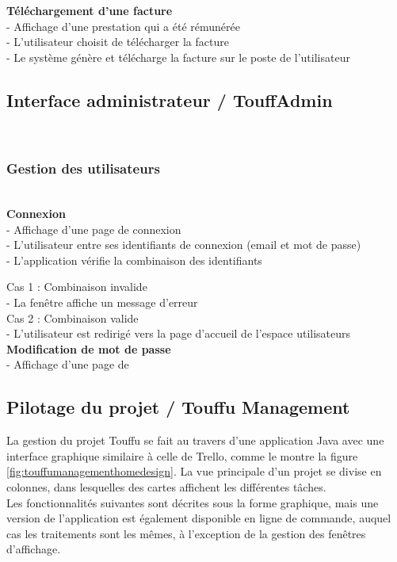 \documentclass[conference]{IEEEtran}
\begin{document}
\textbf{Téléchargement d'une facture}\hfil\\
- Affichage d'une prestation qui a été rémunérée\\
- L'utilisateur choisit de télécharger la facture\\
- Le système génère et télécharge la facture sur le poste de l'utilisateur\\

\subsection{Interface administrateur / TouffAdmin}\hfil\\

\subsubsection{Gestion des utilisateurs}\hfil\\

\textbf{Connexion}\\
- Affichage d'une page de connexion\\
- L'utilisateur entre ses identifiants de connexion (email et mot de passe)\\
- L'application vérifie la combinaison des identifiants

Cas 1 : Combinaison invalide\\
- La fenêtre affiche un message d'erreur\\
Cas 2 : Combinaison valide\\
- L'utilisateur est redirigé vers la page d'accueil de l'espace utilisateurs\\

\textbf{Modification de mot de passe}\\
- Affichage d'une page de

\subsection{Pilotage du projet / Touffu Management}

La gestion du projet Touffu se fait au travers d'une application Java avec une interface graphique similaire à celle de Trello, comme le montre la figure \ref{fig:touffumanagementhomedesign}. La vue principale d'un projet se divise en colonnes, dans lesquelles des cartes affichent les différentes tâches.\\
Les fonctionnalités suivantes sont décrites sous la forme graphique, mais une version de l'application est également disponible en ligne de commande, auquel cas les traitements sont les mêmes, à l'exception de la gestion des fenêtres d'affichage.
\end{document}
